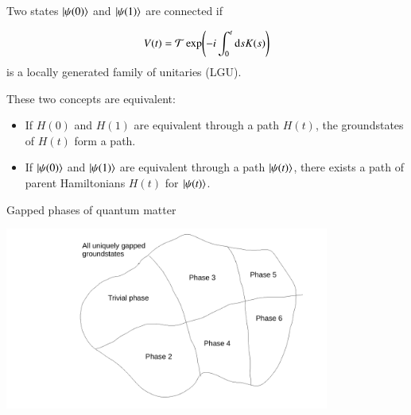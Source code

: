 \documentclass{beamer}
\begin{document}
\begin{frame}
	Two states $\ket{\psi(0)}$ and $\ket{\psi(1)}$ are connected if
	\begin{center}
	\end{center}
	\[V(t)=\mathcal{T}\exp(-i\int_0^t \textrm{d} s K(s))\]
	is a locally generated family of unitaries (LGU).
\end{frame}

\begin{frame}
	These two concepts are equivalent:
	\begin{itemize}
		\item<2-> If $H(0)$ and $H(1)$ are equivalent through a path $H(t)$, the groundstates of $H(t)$ form a path.
		\item<3-> If $\ket{\psi(0)}$ and $\ket{\psi(1)}$ are equivalent through a path $\ket{\psi(t)}$, there exists a path of parent Hamiltonians $H(t)$ for $\ket{\psi(t)}$.
	\end{itemize}
\end{frame}

\begin{frame}{Gapped phases of quantum matter}
	\begin{center}
		\includegraphics[trim={6cm 0 2.5cm 0},clip,width=0.8\textwidth]{Figures/GappedPhasesOfQuantumMatter.pdf}
	\end{center}
\end{frame}
\end{document}
